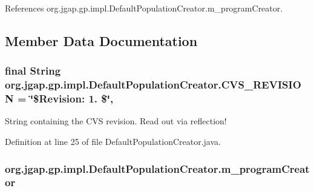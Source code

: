 References org.\-jgap.\-gp.\-impl.\-Default\-Population\-Creator.\-m\-\_\-program\-Creator.



\subsection{Member Data Documentation}
\hypertarget{classorg_1_1jgap_1_1gp_1_1impl_1_1_default_population_creator_a79107b89608ef8eaf1e2fe6bbc054ddb}{
\subsubsection[{C\-V\-S\-\_\-\-R\-E\-V\-I\-S\-I\-O\-N}]{\setlength{\rightskip}{0pt plus 5cm}final String org.\-jgap.\-gp.\-impl.\-Default\-Population\-Creator.\-C\-V\-S\-\_\-\-R\-E\-V\-I\-S\-I\-O\-N = \char`\"{}\$Revision\-: 1. \$\char`\"{}\hspace{0.3cm}{\ttfamily [static]}, {\ttfamily [private]}}}\label{classorg_1_1jgap_1_1gp_1_1impl_1_1_default_population_creator_a79107b89608ef8eaf1e2fe6bbc054ddb}
String containing the C\-V\-S revision. Read out via reflection! 

Definition at line 25 of file Default\-Population\-Creator.\-java.

\hypertarget{classorg_1_1jgap_1_1gp_1_1impl_1_1_default_population_creator_a612e53be286937cc3301a3fb09c932ff}{
\subsubsection[{m\-\_\-program\-Creator}]{ org.\-jgap.\-gp.\-impl.\-Default\-Population\-Creator.\-m\-\_\-program\-Creator\hspace{0.3cm}{\ttfamily [private]}}}\label{classorg_1_1jgap_1_1gp_1_1impl_1_1_default_population_creator_a612e53be286937cc3301a3fb09c932ff}



